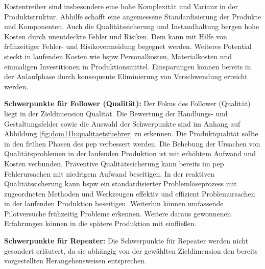 Kostentreiber sind insbesondere eine hohe Komplexität und Varianz in der Produktstruktur. Abhilfe schafft eine angemessene Standardisierung der Produkte und Komponenten. 
Auch die Qualitätssicherung und Instandhaltung bergen hohe Kosten durch unentdeckte Fehler und Risiken. Dem kann mit Hilfe von frühzeitiger Fehler- und Risikovermeidung begegnet werden. 
Weiteres Potential steckt in laufenden Kosten wie \gls{bspw} Personalkosten, Materialkosten und einmaligen Investitionen in Produktionsmittel. Einsparungen können bereits in der Anlaufphase durch konsequente Eliminierung von Verschwendung erreicht werden. 

\textbf{Schwerpunkte für Follower (Qualität):} Der Fokus des Follower (Qualität) liegt in der Zieldimension Qualität.
Die Bewertung der Handlungs- und Gestaltungsfelder sowie die Auswahl der Schwerpunkte sind im Anhang auf Abbildung \ref{fig:dom11b:qualitaetsfuehrer} zu erkennen. 
%
Die Produktqualität sollte in den frühen Phasen des \gls{pep} verbessert werden. Die Behebung der Ursachen von Qualitätsproblemen in der laufenden Produktion ist mit erhöhtem Aufwand und Kosten verbunden. Präventive Qualitätssicherung kann bereits im \gls{pep} Fehlerursachen mit niedrigem Aufwand beseitigen. 
In der reaktiven Qualitätssicherung kann \gls{bspw} ein standardisierter Problemlöseprozess mit zugeordneten Methoden und Werkzeugen effektiv und effizient Problemursachen in der laufenden Produktion beseitigen. 
Weiterhin können umfassende Pilotversuche frühzeitig Probleme erkennen. Weitere daraus gewonnenen Erfahrungen können in die spätere Produktion mit einfließen. 

\textbf{Schwerpunkte für Repeater:} Die Schwerpunkte für Repeater werden nicht gesondert erläutert, da sie abhängig von der gewählten Zieldimension den bereits vorgestellten Herangehensweisen entsprechen. 

